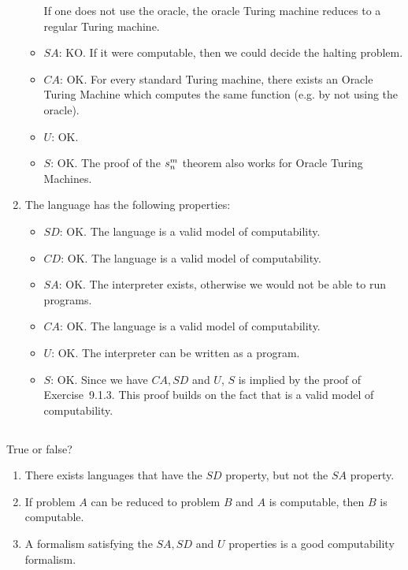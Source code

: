 \begin{solution}
\begin{enumerate}
\begin{itemize}
		If one does not use the oracle,
		the oracle Turing machine reduces to a regular Turing machine.
		\item \(SA\): KO.
		If it were computable,
		then we could decide the halting problem.
		\item \(CA\): OK.
		For every standard Turing machine,
		there exists an Oracle Turing Machine
		which computes the same function
		(e.g. by not using the oracle).
		\item \(U\): OK.
		\item \(S\): OK.
		The proof of the \(s^m_n\) theorem also works
		for Oracle Turing Machines.
	\end{itemize}
	\item The \java{} language has the following properties:
	\begin{itemize}
		\item \(SD\): OK.
		The \java{} language is a valid model of computability.
		\item \(CD\): OK.
		The \java{} language is a valid model of computability.
		\item \(SA\): OK.
		The interpreter exists,
		otherwise we would not be able to run \java{} programs.
		\item \(CA\): OK.
		The \java{} language is a valid model of computability.
		\item \(U\): OK.
		The interpreter can be written as a \java{} program.
		\item \(S\): OK.
		Since we have \(CA, SD\) and \(U\),
		\(S\) is implied by the proof of Exercise~9.1.3.
		This proof builds on the fact that \java{}
		is a valid model of computability.
	\end{itemize}
\end{enumerate}
\end{solution}

\subsection{} %
True or false?
\begin{enumerate}
	\item There exists languages that have the \(SD\) property,
	but not the \(SA\) property.
	\item If problem \(A\) can be reduced to problem \(B\)
	and \(A\) is computable, then \(B\) is computable.
	\item A formalism satisfying the \(SA, SD\) and \(U\) properties
	is a good computability formalism.
\end{enumerate}

